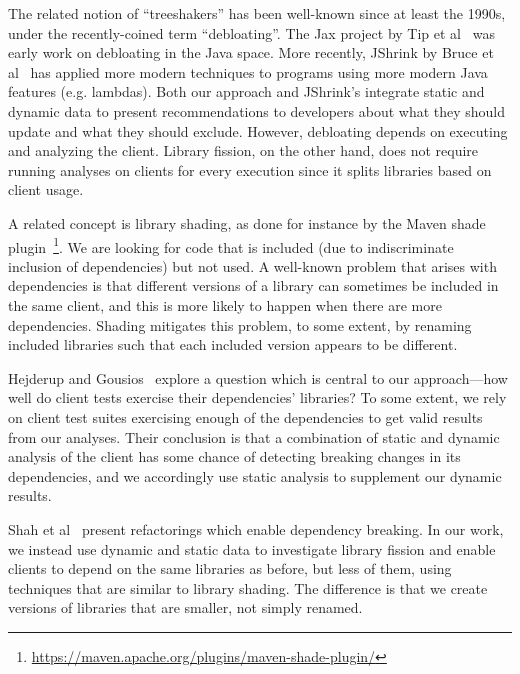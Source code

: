 The related notion of ``treeshakers'' has been well-known since at least the 1990s, under the recently-coined term ``debloating''.
The Jax project by Tip et al~\cite{tip02:_pract_extrac_techn_java} was early work on debloating in the Java space.
More recently, JShrink by Bruce et al~\cite{bruce20:_jshrin} has applied more modern techniques to programs using more modern Java features (e.g. lambdas).
Both our approach and JShrink's integrate static and dynamic data to present recommendations to developers about what they should update and what they should exclude.
However, debloating depends on executing and analyzing the client. Library fission, on the other hand, does not require running analyses on clients for every execution since it splits libraries based on client usage.

A related concept is library shading, as done for instance by the Maven shade plugin~\footnote{\url{https://maven.apache.org/plugins/maven-shade-plugin/}}. We are looking for code that is included (due to indiscriminate inclusion of dependencies) but not used. A well-known problem that arises with dependencies is that different versions of a library can sometimes be included in the same client, and this is more likely to happen when there are more dependencies. Shading mitigates this problem, to some extent, by renaming included libraries such that each included version appears to be different.

Hejderup and Gousios~\cite{DBLP:journals/jss/HejderupG22} explore a question which is central to our approach---how well do client tests exercise their dependencies' libraries? To some extent, we rely on client test suites exercising enough of the dependencies to get valid results from our analyses. Their conclusion is that a combination of static and dynamic analysis of the client has some chance of detecting breaking changes in its dependencies, and we accordingly use static analysis to supplement our dynamic results.



Shah et al~\cite{shah13:_autom_depen_break_refac_java} present refactorings which enable dependency breaking. In our work, we instead use dynamic and static data to investigate library fission and enable clients to depend on the same libraries as before, but less of them, using techniques that are similar to library shading. The difference is that we create versions of libraries that are smaller, not simply renamed.

